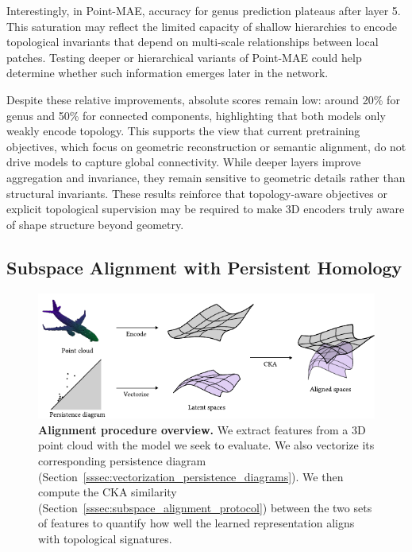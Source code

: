 Interestingly, in Point-MAE, accuracy for genus prediction plateaus after layer 5. This saturation may reflect the limited capacity of shallow hierarchies to encode topological invariants that depend on multi-scale relationships between local patches. Testing deeper or hierarchical variants of Point-MAE could help determine whether such information emerges later in the network.

Despite these relative improvements, absolute scores remain low: around 20\% for genus and 50\% for connected components, highlighting that both models only weakly encode topology. This supports the view that current pretraining objectives, which focus on geometric reconstruction or semantic alignment, do not drive models to capture global connectivity. While deeper layers improve aggregation and invariance, they remain sensitive to geometric details rather than structural invariants. These results reinforce that topology-aware objectives or explicit topological supervision may be required to make 3D encoders truly aware of shape structure beyond geometry.

\subsection{Subspace Alignment with Persistent Homology}
\label{ssec:ph}

\begin{figure}[h]
  \centering
  \includegraphics[width=\linewidth]{figs/alignment.pdf}
  \caption{\textbf{Alignment procedure overview.} We extract features from a 3D point cloud with the model we seek to evaluate. We also vectorize its corresponding persistence diagram (Section~\ref{sssec:vectorization_persistence_diagrams}). We then compute the CKA similarity (Section~\ref{sssec:subspace_alignment_protocol}) between the two sets of features to quantify how well the learned representation aligns with topological signatures.}
  \label{fig:alignment}
\end{figure}

